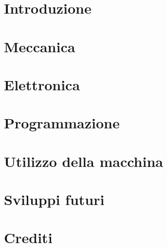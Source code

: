 \documentclass{report}
\begin{document}
\section{Introduzione}

\section{Meccanica}

\section{Elettronica}

\section{Programmazione}

\section{Utilizzo della macchina}

\section{Sviluppi futuri}

\section{Crediti}
\end{document}
